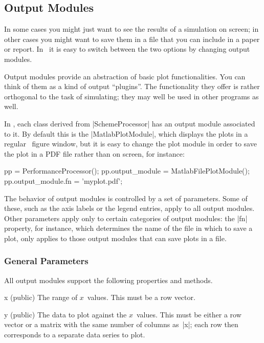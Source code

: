 \subsection{Output Modules}

In some cases you might just want to see the results of a simulation on screen;
in other cases you might want to save them in a file that you can include in a
paper or report. In \jscsim\ it is easy to switch between the two options by
changing output modules.

Output modules provide an abstraction of basic plot functionalities. You can
think of them as a kind of output ``plugins''. The functionality they offer is
rather orthogonal to the task of simulating; they may well be used in other
programs as well. 

In \jscsim, each class derived from |SchemeProcessor| has an output module
associated to it. By default this is the |MatlabPlotModule|, which displays the
plots in a regular \matlab\ figure window, but it is easy to change the plot
module in order to save the plot in a PDF file rather than on screen, for
instance:
\begin{Code}
  pp = PerformanceProcessor();
  pp.output_module = MatlabFilePlotModule();
  pp.output_module.fn = 'myplot.pdf';
\end{Code}

The behavior of output modules is controlled by a set of parameters. Some of
these, such as the axis labels or the legend entries, apply to all
output modules. Other parameters apply only to certain categories of output
modules: the |fn| property, for instance, which determines the name of the file
in which to save a plot, only applies to those output modules that can save
plots in a file. 


\subsubsection{General Parameters}

All output modules support the following properties and methods.
\begin{property}{x (public)}
  The range of $x$~values. This must be a row vector.
\end{property}
\begin{property}{y (public)}
  The data to plot against the $x$~values. This must be either
  a row vector or a matrix with the same number of columns as~|x|; each
  row then corresponds to a separate data series to plot.
\end{property}

